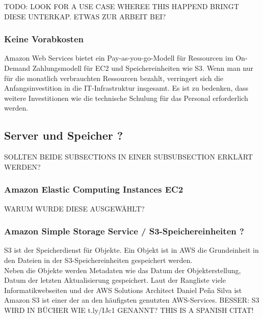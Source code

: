 TODO: LOOK FOR A USE CASE WHEREE THIS HAPPEND
BRINGT DIESE UNTERKAP. ETWAS ZUR ARBEIT BEI?


\subsubsection{Keine Vorabkosten}
Amazon Web Services bietet ein Pay-as-you-go-Modell für Ressourcen im On-Demand
Zahlungsmodell für EC2 und Speichereinheiten wie S3.
Wenn man nur für die monatlich verbrauchten Ressourcen bezahlt, verringert sich die Anfangsinvestition in die IT-Infrastruktur insgesamt. Es ist zu bedenken, dass weitere Investitionen wie die technische Schulung für das Personal erforderlich werden.


\subsection{Server und Speicher ?}
SOLLTEN BEIDE SUBSECTIONS IN EINER SUBSUBSECTION ERKLÄRT WERDEN?
\subsubsection{Amazon Elastic Computing Instances EC2 }
WARUM WURDE DIESE AUSGEWÄHLT?
\subsubsection{Amazon Simple Storage Service / S3-Speichereinheiten ?}
S3 ist der Speicherdienst für Objekte. Ein Objekt ist in AWS die Grundeinheit in den Dateien in der S3-Speichereinheiten gespeichert werden. 
\\
Neben die Objekte werden Metadaten wie das Datum der Objekterstellung, Datum der letzten Aktualisierung gespeichert.
Laut der Rangliste viele Informatikwebseiten und der AWS Solutions Architect Daniel Peña Silva{\cite{STA1}} ist Amazon S3 ist einer der an den häufigsten genutzten AWS-Services. BESSER: S3 WIRD IN BÜCHER WIE t.ly/IJc1 GENANNT? THIS IS A SPANISH CITAT!

